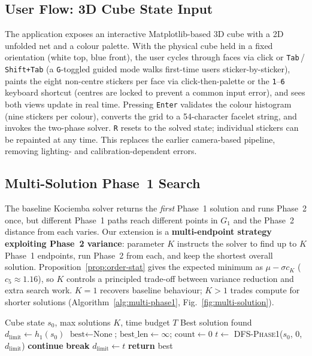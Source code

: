 \documentclass[graybox]{svmult}
\begin{document}
\subsection{User Flow: 3D Cube State Input}
\label{sec:user-flow}

The application exposes an interactive Matplotlib-based 3D cube with a 2D unfolded net and a colour palette. With the physical cube held in a fixed orientation (white top, blue front), the user cycles through faces via click or \texttt{Tab}\,/\,\texttt{Shift+Tab} (a \texttt{G}-toggled guided mode walks first-time users sticker-by-sticker), paints the eight non-centre stickers per face via click-then-palette or the \texttt{1}--\texttt{6} keyboard shortcut (centres are locked to prevent a common input error), and sees both views update in real time. Pressing \texttt{Enter} validates the colour histogram (nine stickers per colour), converts the grid to a 54-character facelet string, and invokes the two-phase solver. \texttt{R} resets to the solved state; individual stickers can be repainted at any time. This replaces the earlier camera-based pipeline, removing lighting- and calibration-dependent errors.

\subsection{Multi-Solution Phase~1 Search}
\label{sec:multi-phase1}

The baseline Kociemba solver returns the \emph{first} Phase~1 solution and runs Phase~2 once, but different Phase~1 paths reach different points in $G_1$ and the Phase~2 distance from each varies. Our extension is a \textbf{multi-endpoint strategy exploiting Phase~2 variance}: parameter $K$ instructs the solver to find up to $K$ Phase~1 endpoints, run Phase~2 from each, and keep the shortest overall solution. Proposition~\ref{prop:order-stat} gives the expected minimum as $\mu - \sigma c_K$ ($c_5 \approx 1.16$), so $K$ controls a principled trade-off between variance reduction and extra search work. $K{=}1$ recovers baseline behaviour; $K{>}1$ trades compute for shorter solutions (Algorithm~\ref{alg:multi-phase1}, Fig.~\ref{fig:multi-solution}).

\begin{algorithm}[t]
\caption{Multi-Solution Phase~1 IDA*}
\label{alg:multi-phase1}
\begin{algorithmic}[1]
\REQUIRE Cube state $s_0$, max solutions $K$, time budget $T$
\ENSURE Best solution found
\STATE $d_{\text{limit}} \gets h_1(s_0)$
\STATE $\text{best} \gets \text{None}$; $\text{best\_len} \gets \infty$; $\text{count} \gets 0$
  \STATE $t \gets$ \textsc{DFS-Phase1}($s_0$, $0$, $d_{\text{limit}}$)
    \STATE \textbf{continue}
    \STATE \textbf{break} 
  \ELSE
    \STATE $d_{\text{limit}} \gets t$ 
  \ENDIF
\ENDWHILE
\STATE \textbf{return} best
\end{algorithmic}
\end{algorithm}
\end{document}
